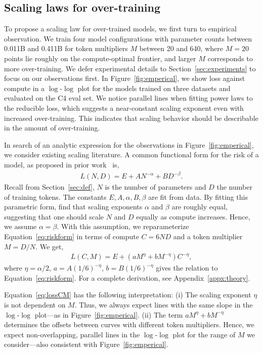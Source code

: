\documentclass[dvipsnames,11pt]{article}
\begin{document}
\subsection{Scaling laws for over-training}
\label{sec:method_overtraining}

To propose a scaling law for over-trained models, we first turn to empirical observation.
We train four model configurations with parameter counts between 0.011B and 0.411B for token multipliers $M$ between 20 and 640, where $M=20$ points lie roughly on the compute-optimal frontier, and larger $M$ corresponds to more over-training.
We defer experimental details to Section~\ref{sec:experiments} to focus on our observations first.
In Figure~\ref{fig:emperical}, we show loss against compute in a $\log$-$\log$ plot for the models trained on three datasets and evaluated on the C4 eval set. 
We notice parallel lines when fitting power laws to the reducible loss, which suggests a near-constant scaling exponent even with increased over-training. 
This indicates that scaling behavior should be describable in the amount of over-training.

In search of an analytic expression for the observations in Figure~\ref{fig:emperical}, we consider existing scaling literature.
A common functional form for the risk of a model, as proposed in prior work~\cite{rosenfeld_ConstructivePredictionGeneralization_2020,chinchilla} is,
\begin{align}
\label{eq:riskform}
L(N,D) = E + A N^{-\alpha} + B D^{-\beta}.
\end{align}
Recall from Section~\ref{sec:def}, $N$ is the number of parameters and $D$ the number of training tokens.
The constants $E, A, \alpha, B, \beta$ are fit from data.
By fitting this parametric form, \citet{chinchilla} find that scaling exponents $\alpha$ and $\beta$ are roughly equal, suggesting that one should scale $N$ and $D$ equally as compute increases. Hence, we assume $\alpha=\beta$. 
With this assumption, we reparameterize Equation~\eqref{eq:riskform} in terms of compute $C = 6ND$ and a token multiplier $M = D/N$. 
We get,
\begin{align}
\label{eq:lossCM}
L(C,M)
=
E + \left(a M^{\eta} + b M^{-\eta} \right) C^{-\eta},
\end{align}
where $\eta = \alpha/2$, $a = A(1/6)^{-\eta}$, $b=B(1/6)^{-\eta}$ gives the relation to Equation~\eqref{eq:riskform}.
For a complete derivation, see Appendix~\ref{appx:theory}.

Equation~\eqref{eq:lossCM} has the following interpretation:
(i) The scaling exponent $\eta$ is not dependent on $M$. Thus, we always expect lines with the same slope in the $\log$-$\log$ plot---as in Figure~\ref{fig:emperical}.  
(ii) The term $a M^{\eta} + b M^{-\eta}$ determines the offsets between curves with different token multipliers. Hence, we expect non-overlapping, parallel lines in the $\log$-$\log$ plot for the range of $M$ we consider---also consistent with Figure~\ref{fig:emperical}.
\end{document}
